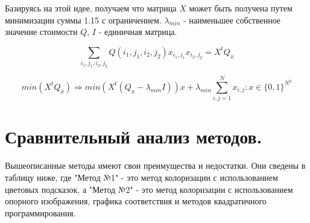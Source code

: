 Базируясь на этой идее, получаем что матрица $X$ может быть получена путем минимизации суммы 1.15 с ограничением. $\lambda_{min}$  - наименьшее собственное значение стоимости $Q$, $I$ - единичная матрица.

\begin{equation}
\sum_{i_1, j_1, i_2, j_2} Q(i_1, j_1, i_2, j_2) x_{i_1, j_1} x_{i_2, j_2} = X^t Q_x 
\end{equation}

\begin{equation}
min(X^t Q_x)  \Rightarrow min(X^t (Q_x - \lambda_{min} I))x + \lambda_{min} \sum_{i,j=1}^{N} x_{i,j} : x \in {\{0,1\}}^{N^2}
\end{equation}

\section{Сравнительный анализ методов.}
Вышеописанные методы имеют свои преимущества и недостатки. Они сведены в таблицу ниже, где "Метод №1" - это метод колоризации с использованием цветовых подсказок, а "Метод №2" - это метод колоризации с использованием опорного изображения, графика соответствия и методов квадратичного программирования.
\newpage
